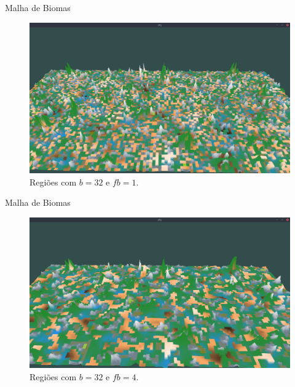 \begin{frame}{Malha de Biomas}
    \begin{figure}[H]
        \centering
        \includegraphics[width=.9\textwidth]{img/re2bfb/fb/1b32.png}
        \caption{Regiões com $b = 32$ e $fb = 1$.}
        \label{fig:img_re2bfb_fb_1b32}
    \end{figure}
    
    
\end{frame}

\begin{frame}{Malha de Biomas}
    \begin{figure}[H]
        \centering
        \includegraphics[width=.9\textwidth]{img/re2bfb/fb/4b32.png}
        \caption{Regiões com $b = 32$ e $fb = 4$.}
        \label{fig:img_re2bfb_fb_4b32}
    \end{figure}
    
    
\end{frame}

